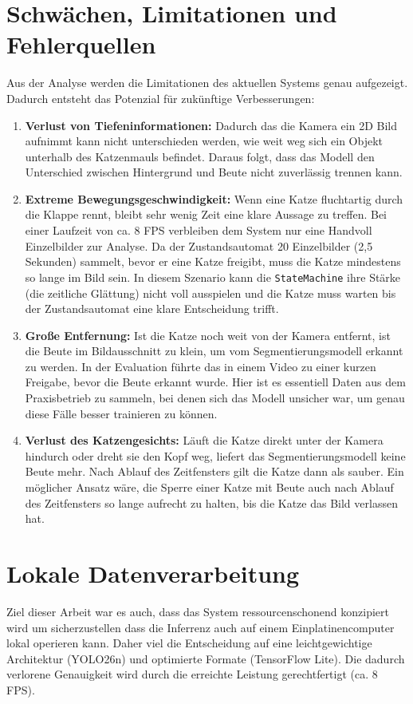\section{Schwächen, Limitationen und Fehlerquellen}
Aus der Analyse werden die Limitationen des aktuellen Systems genau aufgezeigt. Dadurch entsteht das Potenzial für zukünftige Verbesserungen:

\begin{enumerate}
    \item \textbf{Verlust von Tiefeninformationen:} Dadurch das die Kamera ein 2D Bild aufnimmt kann nicht unterschieden werden, wie weit weg sich ein Objekt unterhalb des Katzenmauls befindet. Daraus folgt, dass das Modell den Unterschied zwischen Hintergrund und Beute nicht zuverlässig trennen kann.
    \item \textbf{Extreme Bewegungsgeschwindigkeit:} Wenn eine Katze fluchtartig durch die Klappe rennt, bleibt sehr wenig Zeit eine klare Aussage zu treffen. Bei einer Laufzeit von ca. 8 FPS verbleiben dem System nur eine Handvoll Einzelbilder zur Analyse. Da der Zustandsautomat 20 Einzelbilder (2,5 Sekunden) sammelt, bevor er eine Katze freigibt, muss die Katze mindestens so lange im Bild sein.  In diesem Szenario kann die \texttt{StateMachine} ihre Stärke (die zeitliche Glättung) nicht voll ausspielen und die Katze muss warten bis der Zustandsautomat eine klare Entscheidung trifft.
    \item \textbf{Große Entfernung:} Ist die Katze noch weit von der Kamera entfernt, ist die Beute im Bildausschnitt zu klein, um vom Segmentierungsmodell erkannt zu werden. In der Evaluation führte das in einem Video zu einer kurzen Freigabe, bevor die Beute erkannt wurde. Hier ist es essentiell Daten aus dem Praxisbetrieb zu sammeln, bei denen sich das Modell unsicher war, um genau diese Fälle besser trainieren zu können.
    \item \textbf{Verlust des Katzengesichts:} Läuft die Katze direkt unter der Kamera hindurch oder dreht sie den Kopf weg, liefert das Segmentierungsmodell keine Beute mehr. Nach Ablauf des Zeitfensters gilt die Katze dann als sauber. Ein möglicher Ansatz wäre, die Sperre einer Katze mit Beute auch nach Ablauf des Zeitfensters so lange aufrecht zu halten, bis die Katze das Bild verlassen hat.
\end{enumerate}

\section{Lokale Datenverarbeitung}
Ziel dieser Arbeit war es auch, dass das System ressourcenschonend konzipiert wird um sicherzustellen dass die Inferrenz auch auf einem Einplatinencomputer lokal operieren kann. Daher viel die Entscheidung auf eine leichtgewichtige Architektur (YOLO26n) und optimierte Formate (TensorFlow Lite). Die dadurch verlorene Genauigkeit wird durch die erreichte Leistung gerechtfertigt (ca. 8 FPS).

